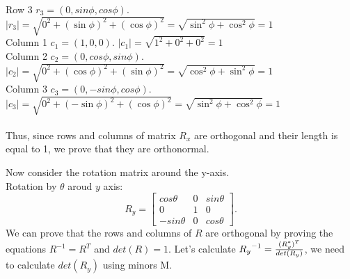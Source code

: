 \documentclass[a4paper, twoside, english]{article}
\begin{document}
 {Row 3 $r_3=(0, sin \phi , cos \phi )$. ${|r_3|}={\sqrt{0^2+(\sin\phi)^2+(\cos \phi)^2}}={\sqrt{ \sin^2 \phi + \cos^2 \phi}} = 1$}\\
 {Column 1 $c_1=(1,0,0)$. ${|c_1|}={\sqrt{1^2+0^2+0^2}}=1$}\\
 {Column 2 $c_2=(0, cos \phi , sin \phi )$. ${|c_2|}={\sqrt{0^2+(\cos\phi)^2+(\sin \phi)^2}}={\sqrt{ \cos^2 \phi + \sin^2 \phi}} = 1$}\\
 {Column 3 $c_3=(0,-sin \phi , cos \phi )$. ${|c_3|}={\sqrt{0^2+(-\sin\phi)^2+(\cos \phi)^2}}={\sqrt{ \sin^2 \phi + \cos^2 \phi}} = 1$}\\\\
Thus, since rows and columns of matrix $R_x$ are orthogonal and their length is equal to 1, we prove that they are orthonormal.

Now consider the rotation matrix around the y-axis.\\
Rotation by $\theta$ aroud $y$ axis:
\begin{equation}
	R_y = \left[
	\begin{array}{ccc}
		cos \theta & 0 & sin \theta \\
		0 & 1 & 0 \\
		-sin \theta & 0 & cos \theta
	\end{array}
	\right].
	\label{eq:kmatrixY}
\end{equation}
We can prove that the rows and columns of $R$ are orthogonal by proving the equations $R^{-1} = R^T$ and $det(R)=1.$
Let's calculate ${{R_y}^{-1}}={{(R_y^*)^T}\over{det(R_y)}}$, we need to calculate $det(R_y)$ using minors M.
\end{document}
